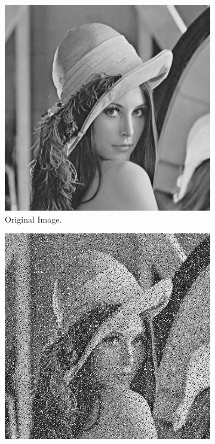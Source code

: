 \documentclass[abstracton]{scrreprt}
\begin{document}
            \begin{figure}[!ht]
                \centering
                \begin{subfigure}[b]{0.31\textwidth}
                    \includegraphics[width=\textwidth]{img/images/lena.png}
                    \caption{Original Image.}
                \end{subfigure}
                \begin{subfigure}[b]{0.31\textwidth}
                    \includegraphics[width=\textwidth]{img/images/lena_sp_noise.png}

\end{subfigure}
\end{figure}
\end{document}
